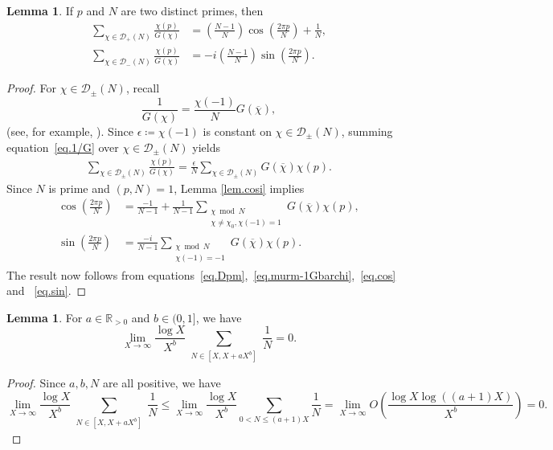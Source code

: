 \documentclass{amsart}
\theoremstyle{definition}
\newtheorem {lemma}[theorem]{Lemma}
\newcommand{\seteq}{\coloneqq}
\numberwithin{equation}{section}
\begin{document}
\begin{lemma}\label{lem.sCGcossin}
If $p$ and $N$ are two distinct primes, then
\begin{align}
\sum_{\chi \in \mathcal{D}_+(N)} \frac{\chi(p)}{G(\chi)} &= \left(\frac{N-1}{N} \right)\cos\left(\frac{2\pi p}{N}\right)+\frac{1}{N},\label{eq.mcos}\\
\sum_{\chi \in \mathcal{D}_-(N)} \frac{\chi(p)}{G(\chi)} &= -i\left(\frac{N-1}{N}\right)\sin\left(\frac{2 \pi p}{N}\right).\label{eq.msin}
\end{align}
\end{lemma}
\begin{proof}
For $\chi \in \mathcal{D}_\pm(N)$, recall 
\begin{equation}\label{eq.1/G}
\frac 1{G(\chi)} = \frac {\chi(-1)} N G(\overline{\chi}) ,
\end{equation}
(see, for example, \cite[Exercise 1.1.1]{Bump}). 
Since $\epsilon \seteq \chi(-1)$ is constant on $\chi \in \mathcal{D}_\pm(N)$, summing equation~\eqref{eq.1/G} over $\chi\in\mathcal{D}_{\pm}(N)$ yields
\begin{align}\label{eq.murm-1Gbarchi}
\sum_{\chi \in \mathcal{D}_\pm(N)} \frac{\chi(p)}{G(\chi)} = 
\frac{\epsilon}{N} \sum_{\chi \in \mathcal{D}_\pm(N)} G(\overline{\chi})\chi(p).
\end{align}
Since $N$ is prime and $(p, N)=1$, Lemma \ref{lem.cosi} implies
\begin{align}
\cos\left(\frac{2 \pi p}{N} \right) &=  \frac{-1}{N-1} + \frac{1}{N-1} \sum_{\substack{\chi \bmod N \\ \chi \neq \chi_0,  \chi(-1) = 1}} G(\overline{\chi}) \chi(p), \label{eq.cos}\\
\sin\left(\frac{2 \pi p}{N} \right) &= \frac{-i}{N-1} \sum_{\substack{\chi \bmod N \\ \chi(-1) = -1}} G(\overline{\chi}) \chi(p).\label{eq.sin}
\end{align}
The result now follows from equations~\eqref{eq.Dpm},~\eqref{eq.murm-1Gbarchi},~\eqref{eq.cos} and ~\eqref{eq.sin}.
\end{proof}

\begin{lemma} For $a \in \mathbb{R}_{>0}$ and $b \in (0,1]$, we have
\begin{equation} \label{eq.1/N}
    \lim_{X \to \infty} \frac{\log X}{X^b} \sum_{\substack{N \in [X, X+aX^b]}} \frac{1}{N} = 0.
\end{equation}
\end{lemma}
\begin{proof} Since $a,b, N$ are all positive, we have
\begin{equation*}
    \lim_{X \to \infty} \frac{\log X}{X^b} \sum_{\substack{N \in [X, X+aX^b]}} \frac{1}{N} \leq \lim_{X \to \infty} \frac{\log X}{X^b} \sum_{0 < N \leq (a+1)X} \frac{1}{N} = \lim_{X \to \infty} O\left(\frac{\log X \log ((a+1)X)}{X^b} \right) = 0.
\end{equation*}
\end{proof}
\end{document}
